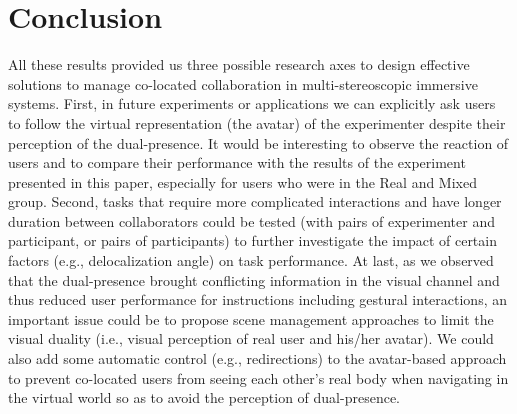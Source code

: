 \section{Conclusion}
All these results provided us three possible research axes to design effective solutions to manage co-located collaboration in multi-stereoscopic immersive systems. First, in future experiments or applications we can explicitly ask users to follow the virtual representation (the avatar) of the experimenter despite their perception of the dual-presence. It would be interesting to observe the reaction of users and to compare their performance with the results of the experiment presented in this paper, especially for users who were in the Real and Mixed group. Second, tasks that require more complicated interactions and have longer duration between collaborators could be tested (with pairs of experimenter and participant, or pairs of participants) to further investigate the impact of certain factors (e.g., delocalization angle) on task performance. At last, as we observed that the dual-presence brought conflicting information in the visual channel and thus reduced user performance for instructions including gestural interactions, an important issue could be to propose scene management approaches to limit the visual duality (i.e., visual perception of real user and his/her avatar). We could also add some automatic control (e.g., redirections) to the avatar-based approach to prevent co-located users from seeing each other's real body when navigating in the virtual world so as to avoid the perception of dual-presence.
